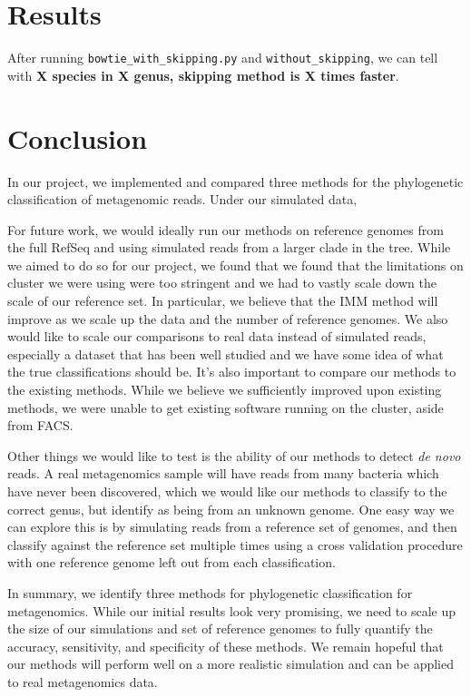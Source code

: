 \documentclass[12pt]{article} %
\begin{document}
\section{Results}
After running \verb|bowtie_with_skipping.py| and \verb|without_skipping|, we can tell with {\bf X species in X genus, skipping method is X times faster}.

\section{Conclusion}
In our project, we implemented and compared three methods for the phylogenetic classification of metagenomic reads. Under our simulated data, 
\par
For future work, we would ideally run our methods on reference genomes from the full RefSeq and using simulated reads from a larger clade in the tree. While we aimed to do so for our project, we found that we found that the limitations on cluster we were using were too stringent and we had to vastly scale down the scale of our reference set. In particular, we believe that the IMM method will improve as we scale up the data and the number of reference genomes. We also would like to scale our comparisons to real data instead of simulated reads, especially a dataset that has been well studied and we have some idea of what the true classifications should be. It's also important to compare our methods to the existing methods. While we believe we sufficiently improved upon existing methods, we were unable to get existing software running on the cluster, aside from FACS. 
\par
Other things we would like to test is the ability of our methods to detect \emph{de novo} reads. A real metagenomics sample will have reads from many bacteria which have never been discovered, which we would like our methods to classify to the correct genus, but identify as being from an unknown genome. One easy way we can explore this is by simulating reads from a reference set of genomes, and then classify against the reference set multiple times using a cross validation procedure with one reference genome left out from each classification.
\par
In summary, we identify three methods for phylogenetic classification for metagenomics. While our initial results  look very promising, we need to scale up the size of our simulations and set of reference genomes to fully quantify the accuracy, sensitivity, and specificity of these methods. We remain hopeful that our methods will perform well on a more realistic simulation and can be applied to real metagenomics data. 
\end{document}
